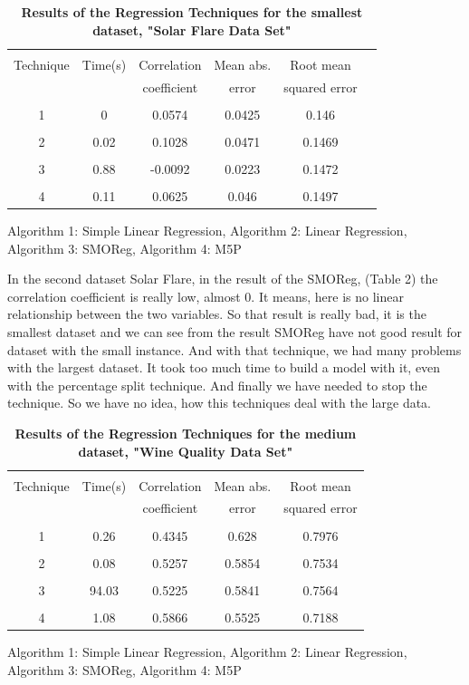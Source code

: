 \documentclass[a4paper]{article}
\begin{document}
\begin{table}
\begin{tabular}{| c | c | c |c |c |c |}
\hline & & & & \\
Technique & Time(s) & Correlation & Mean abs.  & Root mean \\
 & & coefficient & error & squared error  \\
\hline & & & &  \\
1  & 0  & 0.0574  & 0.0425 & 0.146 \\ 
\hline & & & & \\
2  & 0.02  &  0.1028 & 0.0471 & 0.1469  \\ 
\hline & & & & \\
3  & 0.88  & -0.0092 & 0.0223 & 0.1472 \\ 
\hline & & & & \\
4  & 0.11  & 0.0625  & 0.046   & 0.1497 \\ 
\hline
\end{tabular}
\caption{\textbf{Results of the Regression Techniques for the smallest dataset,  "Solar Flare Data Set"}}
    Algorithm 1: Simple Linear Regression,
    Algorithm 2: Linear Regression,
    Algorithm 3: SMOReg,
    Algorithm 4: M5P
\end{table}

In the second dataset Solar Flare, in the result of the SMOReg, (Table 2) the correlation coefficient is really low, almost 0. It means, here is no linear relationship between the two variables. So that result is really bad, it is the smallest dataset and we can see from the result SMOReg have not good result for dataset with the small instance. And with that technique, we had many problems with the largest dataset. It took too much time to build a model with it, even with the percentage split technique. And finally we have needed to stop the technique. So we have no idea, how this techniques deal with the large data. 

\begin{table}
\begin{tabular}{| c | c | c |c |c |}
\hline & & & & \\
Technique & Time(s) & Correlation & Mean abs.  & Root mean \\
 & & coefficient & error & squared error  \\
\hline & & & &  \\
1  & 0.26   & 0.4345  & 0.628   &  0.7976\\ 
\hline & & & & \\
2  & 0.08  & 0.5257  & 0.5854 & 0.7534  \\ 
\hline & & & & \\
3  & 94.03  &  0.5225  & 0.5841 & 0.7564 \\ 
\hline & & & & \\
4  & 1.08  & 0.5866  & 0.5525  & 0.7188 \\ 
\hline
\end{tabular}
\caption{\textbf{Results of the Regression Techniques for the medium dataset, "Wine Quality Data Set"}}
    Algorithm 1: Simple Linear Regression,
    Algorithm 2: Linear Regression,
    Algorithm 3: SMOReg,
    Algorithm 4: M5P
\end{table}
\end{document}
